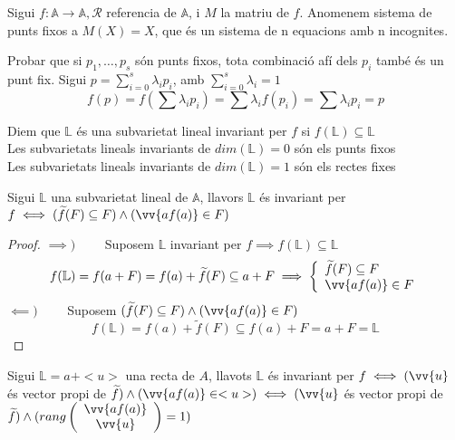\begin{defn}
	Sigui $f:\mathbb{A}\to\mathbb{A},\mathcal{R}$ referencia de $\mathbb{A}$, i $M$ la matriu de $f$. Anomenem sistema de punts fixos a $M(X)=X$, que és un sistema de n equacions amb n incognites.
\end{defn}

Probar que si $p_1,\dotsc,p_s$ són punts fixos, tota combinació afí dels $p_i$ també és un punt fix. Sigui $p=\sum\limits_{i=0}^s\lambda_ip_i$, amb $\sum\limits_{i=0}^s\lambda_i=1$
\[f(p)=f(\sum\lambda_ip_i)=\sum\lambda_if(p_i)=\sum\lambda_ip_i=p\]

\begin{defn}
	Diem que $\mathbb{L}$ és una subvarietat lineal invariant per $f$ si $f(\mathbb{L})\subseteq\mathbb{L}$ \\
	Les subvarietats lineals invariants de $dim(\mathbb{L})=0$ són els punts fixos \\
	Les subvarietats lineals invariants de $dim(\mathbb{L})=1$ són els rectes fixes
\end{defn}

\begin{prop}
	Sigui $\mathbb{L}$ una subvarietat lineal de $\mathbb{A}$, llavors $\mathbb{L}$ és invariant per $f\iff(\widetilde{f}(F)\subseteq F)\land(\vv{af(a)}\in F)$
\end{prop}
\begin{proof}
	$\implies )\hspace{2em}$ Suposem $\mathbb{L}$ invariant per $f\implies f(\mathbb{L})\subseteq\mathbb{L}$
	\[f(\mathbb{L})=f(a+F)=f(a)+\widetilde{f}(F)\subseteq a+F\implies\left\{\begin{array}{l}
		\widetilde{f}(F)\subseteq F\\
		\vv{af(a)}\in F\\
	\end{array}\right.\]
	$\impliedby )\hspace{2em}$ Suposem $(\widetilde{f}(F)\subseteq F)\land(\vv{af(a)}\in F)$
	\[f(\mathbb{L})=f(a)+\widetilde{f}(F)\subseteq f(a)+F=a+F=\mathbb{L}\]
\end{proof}

\begin{cor}
	Sigui $\mathbb{L}=a+<u>$ una recta de $A$, llavots $\mathbb{L}$ és invariant per $f\iff(\vv{u}$ és vector propi de $\widetilde{f})\land(\vv{af(a)}\in<u>)\iff(\vv{u}$ és vector propi de $\widetilde{f})\land(rang\left(\begin{array}{c}\vv{af(a)}\\\vv{u}\\\end{array}\right)=1)$
\end{cor}

